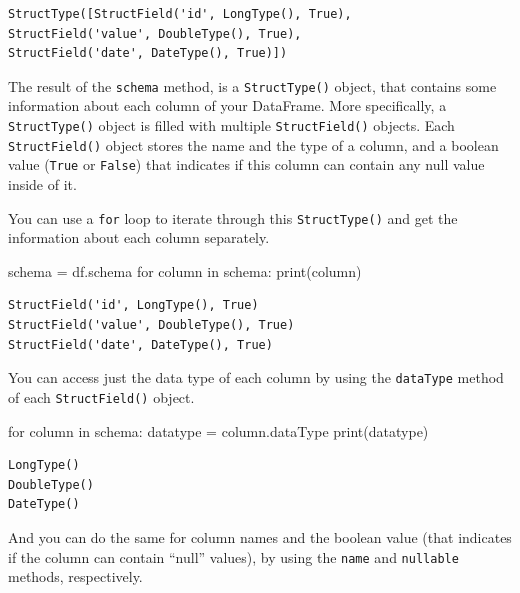 \documentclass[
  11pt,
  letterpaper,
  DIV=11,
  numbers=noendperiod]{scrreprt}
\newenvironment{Shaded}{\begin{snugshade}}{\end{snugshade}}
\newcommand{\BuiltInTok}[1]{\textcolor[rgb]{0.00,0.23,0.31}{#1}}
\newcommand{\ControlFlowTok}[1]{\textcolor[rgb]{0.00,0.23,0.31}{#1}}
\newcommand{\KeywordTok}[1]{\textcolor[rgb]{0.00,0.23,0.31}{#1}}
\newcommand{\NormalTok}[1]{\textcolor[rgb]{0.00,0.23,0.31}{#1}}
\newcommand{\OperatorTok}[1]{\textcolor[rgb]{0.37,0.37,0.37}{#1}}
\begin{document}
\begin{verbatim}
StructType([StructField('id', LongType(), True),
StructField('value', DoubleType(), True),
StructField('date', DateType(), True)])
\end{verbatim}

The result of the \texttt{schema} method, is a \texttt{StructType()}
object, that contains some information about each column of your
DataFrame. More specifically, a \texttt{StructType()} object is filled
with multiple \texttt{StructField()} objects. Each
\texttt{StructField()} object stores the name and the type of a column,
and a boolean value (\texttt{True} or \texttt{False}) that indicates if
this column can contain any null value inside of it.

You can use a \texttt{for} loop to iterate through this
\texttt{StructType()} and get the information about each column
separately.

\begin{Shaded}
\begin{Highlighting}[]
\NormalTok{schema }\OperatorTok{=}\NormalTok{ df.schema}
\ControlFlowTok{for}\NormalTok{ column }\KeywordTok{in}\NormalTok{ schema:}
  \BuiltInTok{print}\NormalTok{(column)}
\end{Highlighting}
\end{Shaded}

\begin{verbatim}
StructField('id', LongType(), True)
StructField('value', DoubleType(), True)
StructField('date', DateType(), True)
\end{verbatim}

You can access just the data type of each column by using the
\texttt{dataType} method of each \texttt{StructField()} object.

\begin{Shaded}
\begin{Highlighting}[]
\ControlFlowTok{for}\NormalTok{ column }\KeywordTok{in}\NormalTok{ schema:}
\NormalTok{  datatype }\OperatorTok{=}\NormalTok{ column.dataType}
  \BuiltInTok{print}\NormalTok{(datatype)}
\end{Highlighting}
\end{Shaded}

\begin{verbatim}
LongType()
DoubleType()
DateType()
\end{verbatim}

And you can do the same for column names and the boolean value (that
indicates if the column can contain ``null'' values), by using the
\texttt{name} and \texttt{nullable} methods, respectively.
\end{document}
